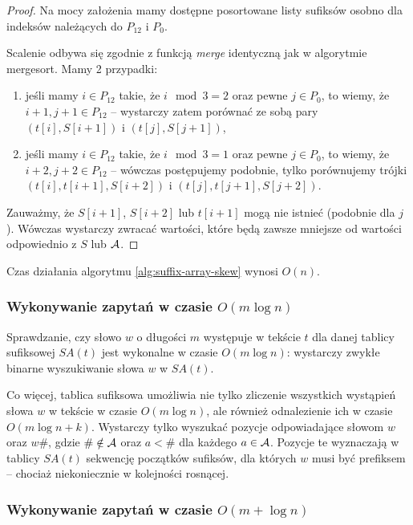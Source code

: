 \begin{proof}
  Na mocy założenia mamy dostępne posortowane listy sufiksów osobno dla indeksów należących do $P_{12}$ i $P_0$.
  
  Scalenie odbywa się zgodnie z funkcją \emph{merge} identyczną jak w algorytmie mergesort. Mamy 2 przypadki:
  \begin{enumerate}
    \item jeśli mamy $i \in P_{12}$ takie, że $i \mod 3 = 2$ oraz pewne $j \in P_0$, to wiemy, że $i + 1, j + 1 \in P_{12}$ -- wystarczy zatem porównać ze sobą pary $(t[i], S[i + 1])$ i $(t[j], S[j + 1])$,
    \item jeśli mamy $i \in P_{12}$ takie, że $i \mod 3 = 1$ oraz pewne $j \in P_0$, to wiemy, że $i + 2, j + 2 \in P_{12}$ -- wówczas postępujemy podobnie, tylko porównujemy trójki $(t[i], t[i + 1], S[i + 2])$ i $(t[j], t[j + 1], S[j + 2])$.
  \end{enumerate}
  Zauważmy, że $S[i + 1]$, $S[i + 2]$ lub $t[i + 1]$ mogą nie istnieć (podobnie dla $j$). Wówczas wystarczy zwracać wartości, które będą zawsze mniejsze od wartości odpowiednio z $S$ lub $\mathcal{A}$.
\end{proof}

\begin{theorem}{}{}
  Czas działania algorytmu \ref{alg:suffix-array-skew} wynosi $O(n)$.
\end{theorem}

\subsubsection{Wykonywanie zapytań w czasie $O(m \log{n})$}

Sprawdzanie, czy słowo $w$ o długości $m$ występuje w tekście $t$ dla danej tablicy sufiksowej $SA(t)$ jest wykonalne w czasie $O(m \log{n})$: wystarczy zwykłe binarne wyszukiwanie słowa $w$ w $SA(t)$.

Co więcej, tablica sufiksowa umożliwia nie tylko zliczenie wszystkich wystąpień słowa $w$ w tekście w czasie $O(m \log{n})$, ale również odnalezienie ich w czasie $O(m \log{n} + k)$. Wystarczy tylko wyszukać pozycje odpowiadające słowom $w$ oraz $w\#$, gdzie $\# \notin \mathcal{A}$ oraz $a < \#$ dla każdego $a \in \mathcal{A}$. Pozycje te wyznaczają w tablicy $SA(t)$ sekwencję początków sufiksów, dla których $w$ musi być prefiksem -- chociaż niekoniecznie w kolejności rosnącej.

\subsubsection{Wykonywanie zapytań w czasie $O(m + \log{n})$}

